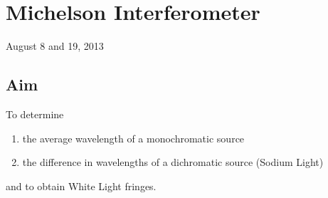 \chapter{Michelson Interferometer}
\begin{flushright}
August 8 and 19, 2013 \\
\end{flushright}

\section{Aim}
	To determine
	\begin{enumerate}
		\item the average wavelength of a monochromatic source 
		\item the difference in wavelengths of a dichromatic source (Sodium Light)
	\end{enumerate}
	and to obtain White Light fringes.

